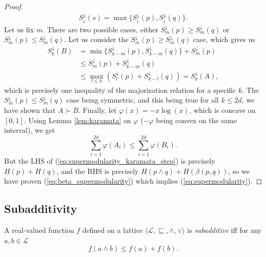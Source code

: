 \begin{proof}
\begin{gather}
        S^\downarrow_i (s) = \max \{S^\downarrow_i (p), S^\downarrow_i (q)\}.
    \end{gather} 
    Let us fix $m$. There are two possible cases, either $S^\downarrow_m (p) \geq S^\downarrow_m (q)$ or $S^\downarrow_m (p) \leq S^\downarrow_m (q)$. Let us consider the $S^\downarrow_m (p) \geq S^\downarrow_m (q)$ case, which gives us
    \begin{align}
        S^\downarrow_k (B) &= \min \{S^\downarrow_{k-m} (p), S^\downarrow_{k-m} (q)\} + S^\downarrow_m (p) \\
        &\leq S^\downarrow_m (p) + S^\downarrow_{k-m} (q) \\
        &\leq \max_{l\leq k} (S^\downarrow_l (p) +S^\downarrow_{k-l} (q)) = S^\downarrow_k (A),
    \end{align}
    which is precisely one inequality of the majorization relation for a specific $k$. The $S^\downarrow_m (p) \leq S^\downarrow_m (q)$ case being symmetric, and this being true for all $k \leq 2d$, we have shown that $A \succ B$.
    Finally, let $\varphi(x) = -x \log(x)$, which is concave on $[0, 1]$. Using Lemma \ref{lem:karamata} on $\varphi$ ($-\varphi$ being convex on the same interval), we get
    \begin{equation} \label{eq:supermodularity_karamata_step}
        \sum_{i=1}^{2d} \varphi(A_i) \leq \sum_{i=1}^{2d} \varphi(B_i).
    \end{equation}
    But the LHS of (\ref{eq:supermodularity_karamata_step}) is precisely $H(p) + H(q)$, and the RHS is precisely $H(p \wedge q) + H(\beta(p, q))$, so we have proven (\ref{eq:beta_supermodularity}) which implies (\ref{eq:supermodularity}). \qedhere
\end{proof}



\subsection{Subadditivity} \label{sec:subadditivity}

\begin{definition}[Subadditivity]
    A real-valued function $f$ defined on a lattice $\langle \mathcal{L}, \sqsubseteq, \wedge, \vee \rangle$ is \textit{subadditive} iff for any $a, b \in \mathcal{L}$
    \begin{equation}
        f(a \wedge b) \leq f(a) + f(b).
    \end{equation}
\end{definition}

